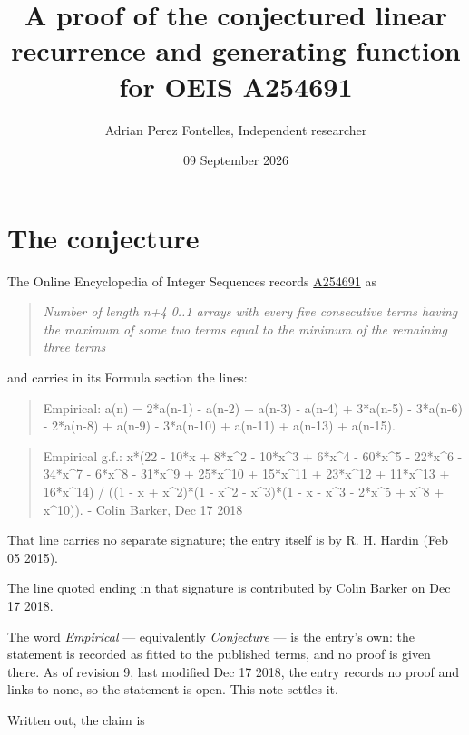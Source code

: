 \documentclass[11pt]{article}
\title{A proof of the conjectured linear recurrence and generating function for OEIS A254691}
\author{Adrian Perez Fontelles, Independent researcher}
\date{09 September 2026}
\theoremstyle{definition}
\begin{document}
\maketitle
\section{The conjecture}

The Online Encyclopedia of Integer Sequences records \href{https://oeis.org/A254691}{A254691} as

\begin{quote}\itshape Number of length n+4 0..1 arrays with every five consecutive terms having the maximum of some two terms equal to the minimum of the remaining three terms\end{quote}

and carries in its Formula section the lines:

\begin{quote}\ttfamily Empirical: a(n) = 2*a(n-1) - a(n-2) + a(n-3) - a(n-4) + 3*a(n-5) - 3*a(n-6) - 2*a(n-8) + a(n-9) - 3*a(n-10) + a(n-11) + a(n-13) + a(n-15).\end{quote}

\begin{quote}\ttfamily Empirical g.f.: x*(22 - 10*x + 8*x\textasciicircum{}2 - 10*x\textasciicircum{}3 + 6*x\textasciicircum{}4 - 60*x\textasciicircum{}5 - 22*x\textasciicircum{}6 - 34*x\textasciicircum{}7 - 6*x\textasciicircum{}8 - 31*x\textasciicircum{}9 + 25*x\textasciicircum{}10 + 15*x\textasciicircum{}11 + 23*x\textasciicircum{}12 + 11*x\textasciicircum{}13 + 16*x\textasciicircum{}14) / ((1 - x + x\textasciicircum{}2)*(1 - x\textasciicircum{}2 - x\textasciicircum{}3)*(1 - x - x\textasciicircum{}3 - 2*x\textasciicircum{}5 + x\textasciicircum{}8 + x\textasciicircum{}10)). - Colin Barker, Dec 17 2018\end{quote}

That line carries no separate signature; the entry itself is by R. H. Hardin (Feb 05 2015).

The line quoted ending in that signature is contributed by Colin Barker on Dec 17 2018.

The word {\itshape Empirical} --- equivalently {\itshape Conjecture} --- is the entry's own: the statement is recorded as fitted to the published terms, and no proof is given there. As of revision 9, last modified Dec 17 2018, the entry records no proof and links to none, so the statement is open. This note settles it.

Written out, the claim is
\end{document}
